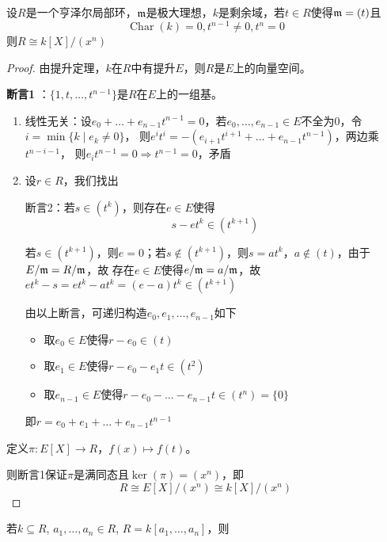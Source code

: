 \documentclass[11pt]{article}
\DeclareMathOperator{\Char}{Char}
\begin{document}
\begin{lemma}[]
设\(R\)是一个亨泽尔局部环，\(\mathfrak{m}\)是极大理想，\(k\)是剩余域，若\(t\in R\)使得\(\mathfrak{m}=(t)\)且
\begin{equation*}
\Char(k)=0,t^{n-1}\neq 0,t^n=0
\end{equation*}
则\(R\cong k[X]/(x^n)\)
\end{lemma}

\begin{proof}
由提升定理，\(k\)在\(R\)中有提升\(E\)，则\(R\)是\(E\)上的向量空间。

\textbf{断言1} ：\(\{1,t,\dots,t^{n-1}\}\)是\(R\)在\(E\)上的一组基。

\begin{enumerate}
\item 线性无关：设\(e_0+\dots+e_{n-1}t^{n-1}=0\)，若\(e_0,\dots,e_{n-1}\in E\)不全为0，令\(i=\min\{k\mid e_k\neq 0\}\)，
则\(e^it^i=-(e_{i+1}t^{i+1}+\dots+e_{n-1}t^{n-1})\)，两边乘\(t^{n-i-1}\)，
则\(e_it^{n-1}=0\Rightarrow t^{n-1}=0\)，矛盾
\item 设\(r\in R\)，我们找出

断言2：若\(s\in(t^k)\)，则存在\(e\in E\)使得
\begin{equation*}
s-et^k\in(t^{k+1})
\end{equation*}

若\(s\in(t^{k+1})\)，则\(e=0\)；若\(s\notin(t^{k+1})\)，则\(s=at^k\)，\(a\notin(t)\)，由于\(E/\mathfrak{m}=R/\mathfrak{m}\)，故
存在\(e\in E\)使得\(e/\mathfrak{m}=a/\mathfrak{m}\)，故\(et^k-s=et^k-at^k=(e-a)t^k\in(t^{k+1})\)

由以上断言，可递归构造\(e_0,e_1,\dots,e_{n-1}\)如下

\begin{itemize}
\item 取\(e_0\in E\)使得\(r-e_0\in(t)\)
\item 取\(e_1\in E\)使得\(r-e_0-e_1t\in(t^2)\)
\item 取\(e_{n-1}\in E\)使得\(r-e_0-\dots-e_{n-1}t\in(t^n)=\{0\}\)
\end{itemize}
即\(r=e_0+e_1+\dots+e_{n-1}t^{n-1}\)
\end{enumerate}

定义\(\pi:E[X]\to R\)，\(f(x)\mapsto f(t)\)。

则断言1保证\(\pi\)是满同态且\(\ker(\pi)=(x^n)\)，即
\begin{equation*}
R\cong E[X]/(x^n)\cong k[X]/(x^n)
\end{equation*}
\end{proof}

若\(k\subseteq R\), \(a_1,\dots,a_n\in R\), \(R=k[a_1,\dots,a_n]\)，则
\end{document}
